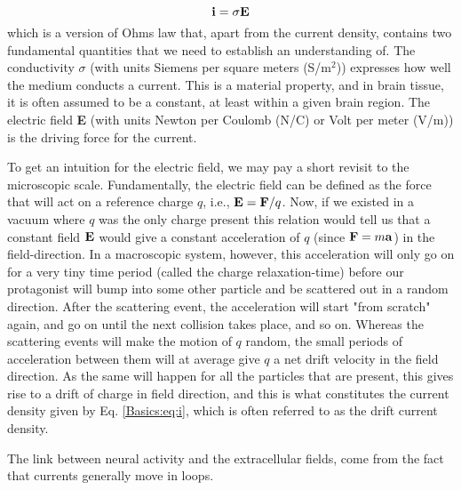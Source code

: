 \begin{equation}
{\bf i} = \sigma {\bf E}
\label{Basics:eq:i}
\end{equation}
which is a version of Ohms law that, apart from the current density, contains two fundamental quantities that we need to establish an understanding of. The conductivity $\sigma$ (with units Siemens per square meters (S/m$^2$)) expresses how well the medium conducts a current. This is a material property, and in brain tissue, it is often assumed to be a constant, at least within a given brain region. The electric field {\bf E} (with units Newton per Coulomb (N/C) or Volt per meter (V/m)) is the driving force for the current.

To get an intuition for the electric field, we may pay a short revisit to the microscopic scale. Fundamentally, the electric field can be defined as the force that will act on a reference charge $q$, i.e., ${\bf E} = {\bf F}/q$. Now, if we existed in a vacuum where $q$ was the only charge present this relation would tell us that a constant field ${\bf E}$ would give a constant acceleration of $q$ (since ${\bf F} = m{\bf a}$) in the field-direction. In a macroscopic system, however, this acceleration will only go on for a very tiny time period (called the charge relaxation-time) before our protagonist will bump into some other particle and be scattered out in a random direction. After the scattering event, the acceleration will start "from scratch" again, and go on until the next collision takes place, and so on. Whereas the scattering events will make the motion of $q$ random, the small periods of acceleration between them will at average give $q$ a net drift velocity in the field direction. As the same will happen for all the particles that are present, this gives rise to a drift of charge in field direction, and this is what constitutes the current density given by Eq. \ref{Basics:eq:i}, which is often referred to as the drift current density. 

The link between neural activity and the extracellular fields, come from the fact that currents generally move in loops. 


